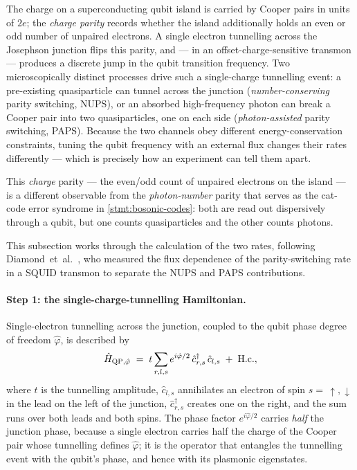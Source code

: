\begin{phenomenon}
The charge on a superconducting qubit island is carried by Cooper
pairs in units of $2e$; the \emph{charge parity} records whether
the island additionally holds an even or odd number of unpaired
electrons. A single electron tunnelling across the Josephson
junction flips this parity, and --- in an offset-charge-sensitive
transmon --- produces a discrete jump in the qubit transition
frequency. Two microscopically distinct processes drive such a
single-charge tunnelling event: a pre-existing quasiparticle can
tunnel across the junction (\emph{number-conserving} parity
switching, NUPS), or an absorbed high-frequency photon can break a
Cooper pair into two quasiparticles, one on each side
(\emph{photon-assisted} parity switching, PAPS). Because the two
channels obey different energy-conservation constraints, tuning the
qubit frequency with an external flux changes their rates
differently --- which is precisely how an experiment can tell them
apart.
\end{phenomenon}

\begin{note}
This \emph{charge} parity --- the even/odd count of unpaired electrons
on the island --- is a different observable from the \emph{photon-number}
parity that serves as the cat-code error syndrome in
\cref{stmt:bosonic-codes}: both are read out dispersively through a
qubit, but one counts quasiparticles and the other counts photons.
\end{note}

This subsection works through the calculation of the two rates,
following Diamond~et~al.~\cite{diamond2022}, who measured the flux
dependence of the parity-switching rate in a SQUID transmon to
separate the NUPS and PAPS contributions.

\paragraph{Step 1: the single-charge-tunnelling Hamiltonian.}
Single-electron tunnelling across the junction, coupled to the
qubit phase degree of freedom $\hat\varphi$, is described by
\begin{equation}
\label{eq:ps-tunnelling-H}
\hat{H}_{{\rm QP},\hat\varphi}
\;=\; t\sum_{r,l,s} e^{i\hat\varphi/2}\,
\hat c_{r,s}^\dagger\,\hat c_{l,s} \;+\; \text{H.c.},
\end{equation}
where $t$ is the tunnelling amplitude, $\hat c_{l,s}$ annihilates an
electron of spin $s=\,\uparrow,\downarrow$ in the lead on the left
of the junction, $\hat c_{r,s}^\dagger$ creates one on the right,
and the sum runs over both leads and both spins. The phase factor
$e^{i\hat\varphi/2}$ carries \emph{half} the junction phase,
because a single electron carries half the charge of the Cooper
pair whose tunnelling defines $\hat\varphi$; it is the operator
that entangles the tunnelling event with the qubit's phase, and
hence with its plasmonic eigenstates.

